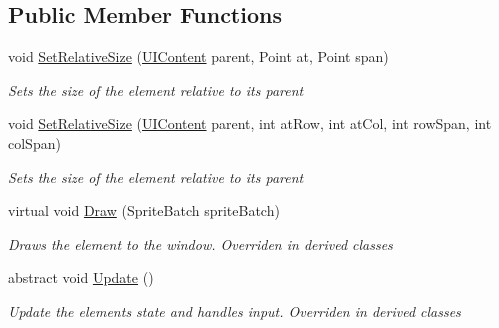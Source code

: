 \subsection*{Public Member Functions}
\begin{DoxyCompactItemize}
\item 
void \hyperlink{class_midnight_blue_1_1_engine_1_1_u_i_1_1_u_i_element_ae111ac1d2f348f78f689a7619ac47853}{Set\+Relative\+Size} (\hyperlink{class_midnight_blue_1_1_engine_1_1_u_i_1_1_u_i_content}{U\+I\+Content} parent, Point at, Point span)
\begin{DoxyCompactList}\small\item\em Sets the size of the element relative to its parent \end{DoxyCompactList}\item 
void \hyperlink{class_midnight_blue_1_1_engine_1_1_u_i_1_1_u_i_element_adbd99f47b33236a076914cc8a7787e24}{Set\+Relative\+Size} (\hyperlink{class_midnight_blue_1_1_engine_1_1_u_i_1_1_u_i_content}{U\+I\+Content} parent, int at\+Row, int at\+Col, int row\+Span, int col\+Span)
\begin{DoxyCompactList}\small\item\em Sets the size of the element relative to its parent \end{DoxyCompactList}\item 
virtual void \hyperlink{class_midnight_blue_1_1_engine_1_1_u_i_1_1_u_i_element_a0faa27f642478cd428c4718f66263325}{Draw} (Sprite\+Batch sprite\+Batch)
\begin{DoxyCompactList}\small\item\em Draws the element to the window. Overriden in derived classes \end{DoxyCompactList}\item 
abstract void \hyperlink{class_midnight_blue_1_1_engine_1_1_u_i_1_1_u_i_element_a5b2bff6eed644fc33bc3e1ffaa8bfc70}{Update} ()
\begin{DoxyCompactList}\small\item\em Update the elements state and handles input. Overriden in derived classes \end{DoxyCompactList}\end{DoxyCompactItemize}
